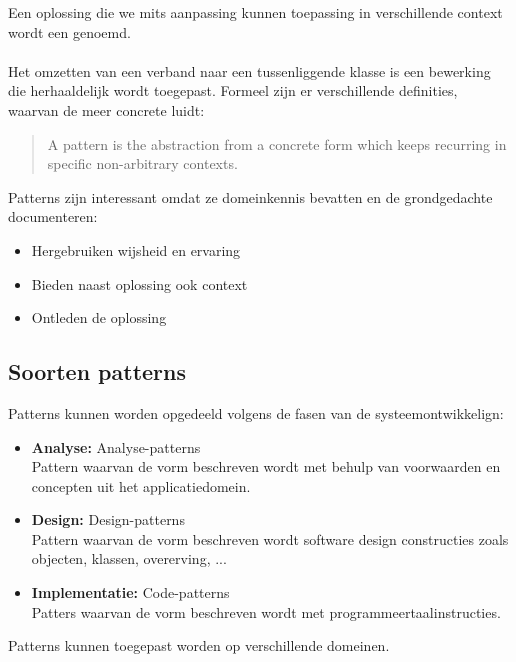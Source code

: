 \documentclass[../../main.tex]{subfiles}
\begin{document}
Een oplossing die we mits aanpassing kunnen toepassing in verschillende context wordt een  genoemd.\\
\\
Het omzetten van een verband naar een tussenliggende klasse is een bewerking die herhaaldelijk wordt toegepast. Formeel zijn er verschillende definities, waarvan de meer concrete luidt:
\begin{quote}
	A pattern is the abstraction from a concrete form which keeps recurring in specific non-arbitrary contexts.
\end{quote}
Patterns zijn interessant omdat ze domeinkennis bevatten en de grondgedachte documenteren:
\begin{itemize}
	\item Hergebruiken wijsheid en ervaring
	\item Bieden naast oplossing ook context
	\item Ontleden de oplossing
\end{itemize}
\subsection{Soorten patterns}
Patterns kunnen worden opgedeeld volgens de fasen van de systeemontwikkelign:
\begin{itemize}
	\item \textbf{Analyse:} Analyse-patterns \\
	Pattern waarvan de vorm beschreven wordt met behulp van voorwaarden en concepten uit het applicatiedomein.
	\item \textbf{Design:} Design-patterns \\
	Pattern waarvan de vorm beschreven wordt software design constructies zoals objecten, klassen, overerving, ...
	\item \textbf{Implementatie:} Code-patterns \\
	Patters waarvan de vorm beschreven wordt met programmeertaalinstructies.
\end{itemize}
\noindent
Patterns kunnen toegepast worden op verschillende domeinen.
\end{document}
